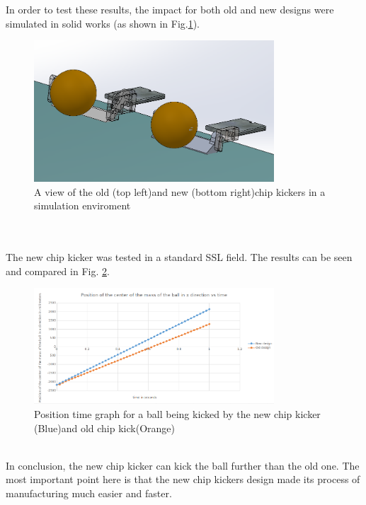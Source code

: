 \indent In order to test these results, the impact for both old and new designs were simulated in solid works (as shown in Fig.\ref{fig:SIM2CHIP}).\\
\begin{figure}
	\centering
	\includegraphics[width=0.8\textwidth]{images/SIM_CHIPx2.png}
	\caption{A view of the old (top left)and new (bottom right)chip kickers in a simulation enviroment}
	\label{fig:SIM2CHIP}
\end{figure}\\
\\
The new chip kicker was tested in a standard SSL field. The results can be seen and compared in Fig. \ref{fig:NEWOLDPLOTBALL}.\\
\begin{figure}
	\centering
	\includegraphics[width=0.8\textwidth]{images/CHIP_POS_PLOT.png}
	\caption{Position time graph for a ball being kicked by the new chip kicker (Blue)and old chip kick(Orange)}
	\label{fig:NEWOLDPLOTBALL}
\end{figure}
\\
In conclusion, the new chip kicker can kick the ball further than the old one. The most important point here is that the new chip kickers design made its process of manufacturing much easier and faster. %




